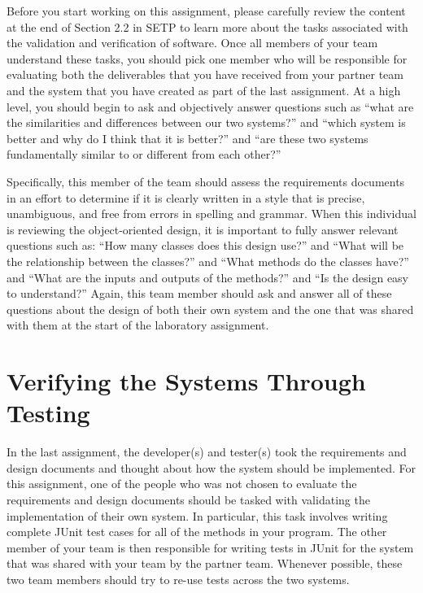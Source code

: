 Before you start working on this assignment, please carefully review the content at the end of Section 2.2 in SETP to
learn more about the tasks associated with the validation and verification of software. Once all members of your team
understand these tasks, you should pick one member who will be responsible for evaluating both the deliverables that you
have received from your partner team and the system that you have created as part of the last assignment. At a high
level, you should begin to ask and objectively answer questions such as ``what are the similarities and differences
between our two systems?'' and ``which system is better and why do I think that it is better?'' and ``are these two
systems fundamentally similar to or different from each other?''

Specifically, this member of the team should assess the requirements documents in an effort to determine if it is
clearly written in a style that is precise, unambiguous, and free from errors in spelling and grammar. When this
individual is reviewing the object-oriented design, it is important to fully answer relevant questions such as: ``How
many classes does this design use?'' and ``What will be the relationship between the classes?'' and ``What methods do
the classes have?'' and ``What are the inputs and outputs of the methods?'' and ``Is the design easy to understand?''
Again, this team member should ask and answer all of these questions about the design of both their own system and the
one that was shared with them at the start of the laboratory assignment.

\section*{Verifying the Systems Through Testing}

In the last assignment, the developer(s) and tester(s) took the requirements and design documents and thought about how
the system should be implemented. For this assignment, one of the people who was not chosen to evaluate the requirements
and design documents should be tasked with validating the implementation of their own system. In particular, this task
involves writing complete JUnit test cases for all of the methods in your program. The other member of your team is
then responsible for writing tests in JUnit for the system that was shared with your team by the partner team. Whenever
possible, these two team members should try to re-use tests across the two systems.

